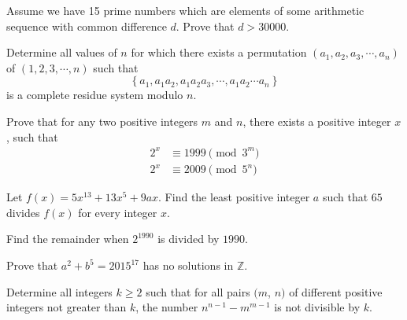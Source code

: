 \documentclass{subfile}
\begin{document}
	\begin{problem} %
		Assume we have 15 prime numbers which are elements of some arithmetic sequence with common difference $d$. Prove that $d>30000$.
	\end{problem}

	\begin{problem} %
		Determine all values of $n$ for which there exists a permutation $(a_1,a_2,a_3,\cdots,a_n)$ of $(1,2,3,\cdots,n)$ such that $$\left\{ {{a_1},{a_1}{a_2},{a_1}{a_2}{a_3},\cdots,{a_1}{a_2}\cdots{a_n}} \right\}$$ is a complete residue system modulo $n$.
	\end{problem}

	\begin{problem} %
		Prove that for any two positive integers $m$ and $n$, there exists a positive integer $x$, such that
			\begin{align*}
				2^x
					& \equiv 1999 \pmod{3^m}\\
				2^x
					& \equiv 2009\pmod{5^n}
			\end{align*}
	\end{problem}

	\begin{problem} %
		Let $f(x) = 5 x^{13} + 13 x^5 + 9ax$. Find the least positive integer $a$ such that $65$ divides $f(x)$ for every integer $x$.
	\end{problem}

	\begin{problem} %
		Find the remainder when $2^{1990}$ is divided by $1990$.
	\end{problem}

	\begin{problem} %
		Prove that $a^{2}+b^{5}=2015^{17}$ has no solutions in $\mathbb{Z}$.
	\end{problem}

	\begin{problem} %
		Determine all integers $ k\ge 2$ such that for all pairs $ (m$, $ n)$ of different positive integers not greater than $ k$, the number $ n^{n-1}-m^{m-1}$ is not divisible by $ k$.
	\end{problem}
\end{document}
